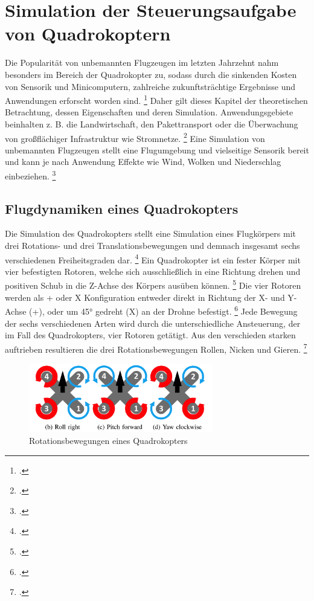 \section{Simulation der Steuerungsaufgabe von Quadrokoptern}
Die Popularität von unbemannten Flugzeugen im letzten Jahrzehnt nahm besonders im Bereich der Quadrokopter zu, sodass durch die sinkenden Kosten von Sensorik und Minicomputern, zahlreiche zukunftsträchtige Ergebnisse und Anwendungen erforscht worden sind. \footcite[Vgl.][S. 1]{Koch.2018}
Daher gilt dieses Kapitel der theoretischen Betrachtung, dessen Eigenschaften und deren Simulation.
Anwendungsgebiete beinhalten z. B. die Landwirtschaft, den Pakettransport oder die Überwachung von großflächiger Infrastruktur wie Stromnetze. \footcite[Vgl.][S. 1]{Deshpande.2020}
Eine Simulation von unbemannten Flugzeugen stellt eine Flugumgebung und vielseitige Sensorik bereit und kann je nach Anwendung Effekte wie Wind, Wolken und Niederschlag einbeziehen. \footcite[Vgl.][S. 1496]{Hentati.2018}

\subsection{Flugdynamiken eines Quadrokopters}
Die Simulation des Quadrokopters stellt eine Simulation eines Flugkörpers mit drei Rotations- und drei Translationsbewegungen und demnach insgesamt sechs verschiedenen Freiheitsgraden dar. \footcite[Vgl.][S. 2]{Koch.2018}
Ein Quadrokopter ist ein fester Körper mit vier befestigten Rotoren, welche sich ausschließlich in eine Richtung drehen und positiven Schub in die Z-Achse des Körpers ausüben können. \footcite[Vgl.][S. 3]{Molchanov.2019}
Die vier Rotoren werden als + oder X Konfiguration entweder direkt in Richtung der X- und Y-Achse (+), oder um 45° gedreht (X) an der Drohne befestigt. \footcite[Vgl.][S. 2]{Koch.2018}
Jede Bewegung der sechs verschiedenen Arten wird durch die unterschiedliche Ansteuerung, der im Fall des Quadrokopters, vier Rotoren getätigt.
Aus den verschieden starken auftrieben resultieren die drei Rotationsbewegungen Rollen, Nicken und Gieren. \footcite[Vgl.][S. 2]{Koch.2018}
\begin{figure}[htb]
    \centering
    \includegraphics[height=3cm]{lib/graphics/Drone axis.png}
    \caption[Rotationsbewegungen eines Quadrokopters]{Rotationsbewegungen eines Quadrokopters\footnotemark}
    \label{abb:drone axis}
\end{figure}

